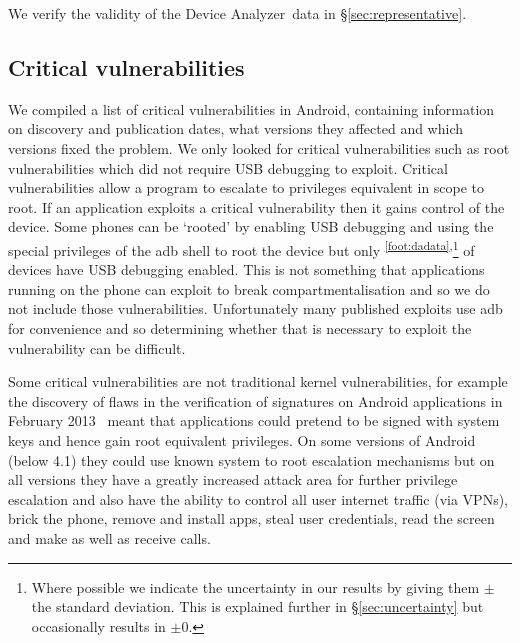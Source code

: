 \documentclass[conference,a4paper,twoside]{IEEEtran}
\let\OldTodo\todo
\renewcommand{\todo}{\OldTodo[inline]}
\newcommand{\todolater}[1]{}%
\newcommand{\da}{Device Analyzer}
\newcommand{\dafoot}{\textsuperscript{\ref{foot:dadata}}}
\begin{document}
We verify the validity of the \da\ data in \S\ref{sec:representative}.



\subsection{Critical vulnerabilities}
We compiled a list of critical vulnerabilities in Android, containing information on discovery and publication dates, what versions they affected and which versions fixed the problem.
We only looked for critical vulnerabilities such as root vulnerabilities which did not require USB debugging to exploit.
Critical vulnerabilities allow a program to escalate to privileges equivalent in scope to root.
If an application exploits a critical vulnerability then it gains control of the device.
Some phones can be `rooted' by enabling USB debugging and using the special privileges of the adb shell to root the device but only \daAdbEnabledPerc\dafoot\textsuperscript{,}\footnote{Where possible we indicate the uncertainty in our results by giving them $\pm$ the standard deviation. This is explained further in \S\ref{sec:uncertainty} but occasionally results in $\pm0$.} of devices have USB debugging enabled.
This is not something that applications running on the phone can exploit to break compartmentalisation and so we do not include those vulnerabilities.
Unfortunately many published exploits use adb for convenience and so determining whether that is necessary to exploit the vulnerability can be difficult.

Some critical vulnerabilities are not traditional kernel vulnerabilities, for example the discovery of flaws in the verification of signatures on Android applications in February 2013~\cite{Forristal2013} meant that applications could pretend to be signed with system keys and hence gain root equivalent privileges.
On some versions of Android (below 4.1) they could use known system to root escalation mechanisms but on all versions they have a greatly increased attack area for further privilege escalation and also have the ability to control all user internet traffic (via VPNs), brick the phone, remove and install apps, steal user credentials, read the screen and make as well as receive calls.
\todolater{break vulnerabilities down by attack vector?}
\avoTabAndVulns
\end{document}
